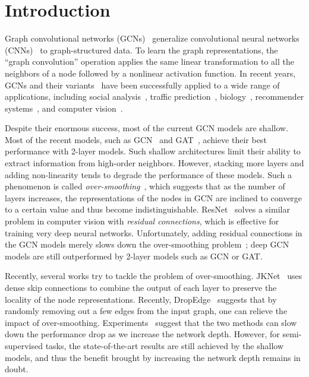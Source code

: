 \documentclass{article}
\begin{document}
\section{Introduction}
\label{sec:intro}
Graph convolutional networks (GCNs)~\cite{DBLP:conf/iclr/KipfW17}  generalize
convolutional neural networks (CNNs)~\cite{lecun1995convolutional} to graph-structured data. To learn the graph
representations, the ``graph convolution'' operation applies the same
linear transformation to all the neighbors of a node followed by a
nonlinear activation function. In recent years, GCNs and their
variants~\cite{DBLP:conf/nips/DefferrardBV16, velickovic2018graph} 
have been successfully applied to a wide range of applications,
including
social analysis~\cite{DBLP:conf/kdd/QiuTMDW018,DBLP:conf/acl/LiG19},
traffic
prediction~\cite{DBLP:conf/aaai/GuoLFSW19,DBLP:conf/kdd/LiHCSWZP19},
biology~\cite{DBLP:conf/nips/FoutBSB17,DBLP:conf/aaai/ShangXMLS19},
recommender systems~\cite{DBLP:conf/kdd/YingHCEHL18}, and computer
vision~\cite{DBLP:conf/cvpr/00030TKM19,DBLP:journals/dase/MaWZCL19}. 





Despite their enormous success, most of the current GCN models are
shallow. Most of the recent
models, such as GCN~\cite{DBLP:conf/iclr/KipfW17}  and
GAT~\cite{velickovic2018graph}, achieve their best performance with 
2-layer models. Such shallow architectures limit their ability to
extract information from
high-order neighbors. However, stacking more layers and adding non-linearity tends
to degrade the performance of these models.
Such a phenomenon is called {\em
  over-smoothing}~\cite{DBLP:conf/aaai/LiHW18}, which suggests that as
the number of layers increases, the representations of the nodes in GCN are inclined to
converge to a certain value and thus become
indistinguishable.
ResNet~\cite{DBLP:conf/cvpr/HeZRS16} solves a  similar problem in  computer
vision with {\em residual connections}, which is effective for training
very deep neural networks. Unfortunately, adding residual connections
in the GCN models merely slows down the over-smoothing
problem~\cite{DBLP:conf/iclr/KipfW17};
deep GCN models are still outperformed by 2-layer models such as GCN or GAT. 



Recently, several works try to tackle the problem of
over-smoothing. JKNet~\cite{DBLP:conf/icml/XuLTSKJ18} uses dense skip connections
to combine the output of each layer to preserve the locality of the node
representations. 
Recently, DropEdge~\cite{rong2020dropedge}
suggests that by randomly removing out a few edges from the input graph,
one can relieve the impact of
over-smoothing. Experiments~\cite{rong2020dropedge} suggest that the two methods
can slow down the performance drop as we increase the network
depth. However, for semi-supervised tasks, the
state-of-the-art results are still achieved by the shallow models,
and thus  the benefit brought by increasing the network depth remains in doubt.
\end{document}
